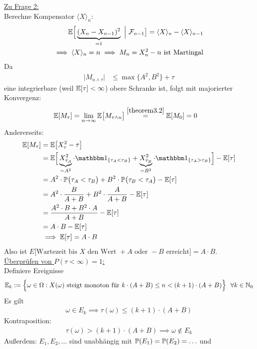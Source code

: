 \begin{beisp}
\underline{Zu Frage 2:}\\
Berechne Kompensator $\langle X\rangle_n$:
\begin{align*}
\E\Big[\underbrace{(X_n-X_{n-1})^2}_{=1}~\Big|~\F_{n-1}\big]=\langle X\rangle_n-\langle X\rangle_{n-1}\\
\implies \langle X\rangle_n=n
\implies M_n=X_n^2-n\text{ ist Martingal}
\end{align*}
Da
\begin{align*}
\big|M_{n\wedge\tau}\big|&\leq
\max\lbrace A^2,B^2\rbrace+\tau
\end{align*}
eine integrierbare (weil $\E[\tau]<\infty$) obere Schranke ist, folgt mit majorierter Konvergenz:
\begin{align*}
\E[M_\tau]&=\limn\E\big[M_{\tau\wedge n}\big]\stackeq{\ref{theorem3.2}}
\E[M_0]=0
\end{align*}
Andererseits:
\begin{align*}
\E[M_\tau]
&=\E\big[X_\tau^2-\tau\big]\\
&=\E\Big[\underbrace{X^2_{\tau_A}}_{=A^2}\cdot\indi_{\lbrace\tau_A<\tau_B\rbrace}+\underbrace{X^2_{\tau_B}}_{=B^2}\cdot\indi_{\lbrace\tau_A>\tau_B\rbrace}\Big] - \E[\tau]\\
&=A^2\cdot\P\big(\tau_A<\tau_B\big)+B^2\cdot\P\big(\tau_B<\tau_A\big)-\E[\tau]\\
&=A^2\cdot\frac{B}{A+B}+B^2\cdot\frac{A}{A+B}-\E[\tau]\\
&=\frac{A^2\cdot B + B^2 \cdot A}{A+B}-\E[\tau]\\
&=A\cdot B-\E[\tau]\\
&\implies
\E[\tau]=A\cdot B
\end{align*}
Also ist $E\big[\text{Wartezeit bis }X\text{ den Wert }+A\text{ oder }-B\text{ erreicht}\big]=A\cdot B$.\nl
\underline{Überprüfen von $P(\tau<\infty)=1$:}\\
Definiere Ereignisse
\begin{align*}
\E_k:=\Big\lbrace\omega\in\Omega:X(\omega)\text{ steigt monoton für }k\cdot(A+B)\leq n<(k+1)\cdot(A+B)\Big\rbrace~~\forall k\in\N_0
\end{align*}
Es gilt
\begin{align*}
\omega\in E_k\implies \tau(\omega)\leq(k+1)\cdot(A+B)
\end{align*}
Kontraposition:
\begin{align*}
\tau(\omega)>(k+1)\cdot(A+B)\implies\omega\not\in E_k
\end{align*}
Außerdem: $E_1,E_2,\ldots$ sind unabhängig mit $\P(E_1)=\P(E_2)=\ldots$ und

\end{beisp}
